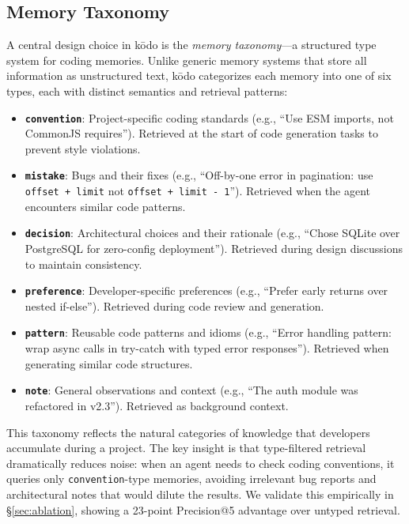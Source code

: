 \documentclass{article}
\begin{document}
\subsection{Memory Taxonomy}
\label{sec:taxonomy}

A central design choice in k\=odo is the \emph{memory taxonomy}---a structured type system for coding memories. Unlike generic memory systems that store all information as unstructured text, k\=odo categorizes each memory into one of six types, each with distinct semantics and retrieval patterns:

\begin{itemize}
    \item \textbf{\texttt{convention}}: Project-specific coding standards (e.g., ``Use ESM imports, not CommonJS requires''). Retrieved at the start of code generation tasks to prevent style violations.
    \item \textbf{\texttt{mistake}}: Bugs and their fixes (e.g., ``Off-by-one error in pagination: use \texttt{offset + limit} not \texttt{offset + limit - 1}''). Retrieved when the agent encounters similar code patterns.
    \item \textbf{\texttt{decision}}: Architectural choices and their rationale (e.g., ``Chose SQLite over PostgreSQL for zero-config deployment''). Retrieved during design discussions to maintain consistency.
    \item \textbf{\texttt{preference}}: Developer-specific preferences (e.g., ``Prefer early returns over nested if-else''). Retrieved during code review and generation.
    \item \textbf{\texttt{pattern}}: Reusable code patterns and idioms (e.g., ``Error handling pattern: wrap async calls in try-catch with typed error responses''). Retrieved when generating similar code structures.
    \item \textbf{\texttt{note}}: General observations and context (e.g., ``The auth module was refactored in v2.3''). Retrieved as background context.
\end{itemize}

This taxonomy reflects the natural categories of knowledge that developers accumulate during a project. The key insight is that type-filtered retrieval dramatically reduces noise: when an agent needs to check coding conventions, it queries only \texttt{convention}-type memories, avoiding irrelevant bug reports and architectural notes that would dilute the results. We validate this empirically in \S\ref{sec:ablation}, showing a 23-point Precision@5 advantage over untyped retrieval.
\end{document}
